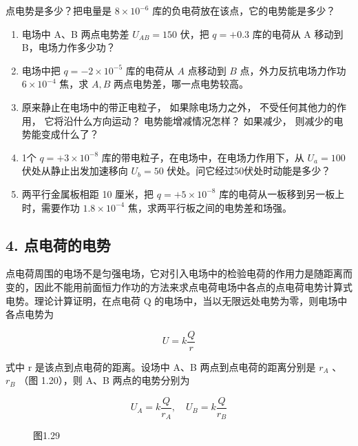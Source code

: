 点电势是多少？把电量是 \(8\times10^{-6}\)
库的负电荷放在该点，它的电势能是多少？

\begin{enumerate}
\def\labelenumi{\arabic{enumi}.}
\setcounter{enumi}{6}
\item
  电场中 A、B 两点电势差 \(U_{AB}=150\) 伏，把 \(q=+0.3\) 库的电荷从 A
  移动到 B，电场力作多少功？
\item
  电场中把 \(q = -2 \times 10^{-5}\) 库的电荷从 \(A\) 点移动到 \(B\)
  点，外力反抗电场力作功 \(6 \times 10^{-4}\) 焦，求 \(A, B\)
  两点电势差，哪一点电势较高。
\item
  原来静止在电场中的带正电粒子， 如果除电场力之外，
  不受任何其他力的作用， 它将沿什么方向运动？ 电势能增减情况怎样？
  如果减少， 则减少的电势能变成什么了？
\item
  1个 \(q = +3 \times 10^{-8}\)
  库的带电粒子，在电场中，在电场力作用下，从 \(U_{a} = 100\)
  伏处从静止出发加速移向 \(U_{b} = 50\)
  伏处。问它经过50伏处时动能是多少？
\item
  两平行金属板相距 10 厘米，把 \(q = +5 \times 10^{-8}\)
  库的电荷从一板移到另一板上时，需要作功 \(1.8 \times 10^{-4}\)
  焦，求两平行板之间的电势差和场强。
\end{enumerate}

\subsection{4. 点电荷的电势}\label{ux70b9ux7535ux8377ux7684ux7535ux52bf}

点电荷周围的电场不是匀强电场，它对引入电场中的检验电荷的作用力是随距离而变的，因此不能用前面恒力作功的方法来求点电荷电场中各点的点电荷电势计算式电势。理论计算证明，在点电荷
Q 的电场中，当以无限远处电势为零，则电场中各点电势为

\[
U = k \frac{Q}{r} \tag{1.8}
\]

式中 r 是该点到点电荷的距离。设场中 A、B 两点到点电荷的距离分别是
\(r_{A}\) 、 \(r_{B}\) （图 1.20），则 A、B 两点的电势分别为

\[
U_{A} = k \frac{Q}{r_{A}}, \quad U_{B} = k \frac{Q}{r_{B}}
\]

\begin{figure}
\centering
{}
\caption{图1.29}
\end{figure}


